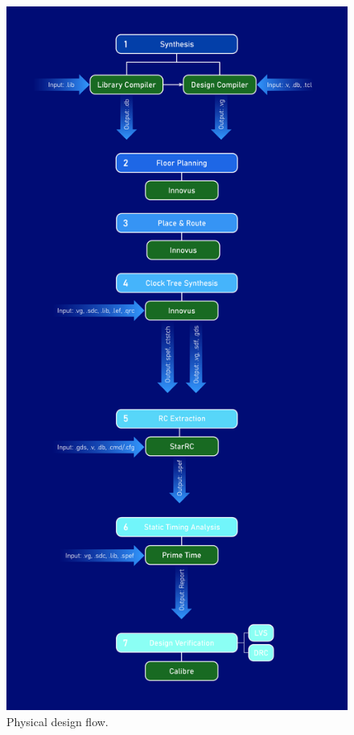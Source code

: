 \documentclass[conference]{IEEEtran}
\begin{document}
\begin{figure}[htbp]
    \centering
    \includegraphics[width=\linewidth]{fig2.jpg} 
    \caption{Physical design flow.}
    \label{fig}
\end{figure}
\end{document}
